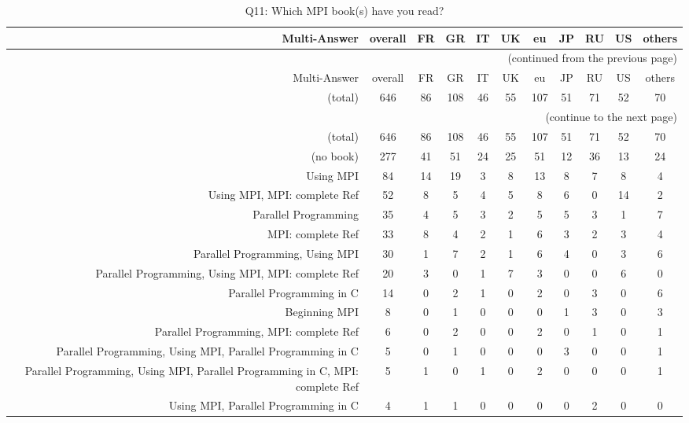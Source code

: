\clearpage%
{\footnotesize\begin{landscape}%
\begin{longtable}[htb]{r|c|c|c|c|c|c|c|c|c|c}%
\caption{Q11: Which MPI book(s) have you read?}%
\label{tab:Q11-mans} \\%
\hline%
Multi-Answer & overall & FR & GR & IT & UK & eu & JP & RU & US & others \\
 \hline%
\endfirsthead%
\multicolumn{11}{r}{(continued from the previous page)}\\%
\hline%
Multi-Answer & overall & FR & GR & IT & UK & eu & JP & RU & US & others \\
 \hline%
\endhead%
\hline%
(total) & 646 & 86 & 108 & 46 & 55 & 107 & 51 & 71 & 52 & 70 \\%
\hline%
\multicolumn{11}{r}{(continue to the next page)}\\%
\endfoot%
\hline%
(total) & 646 & 86 & 108 & 46 & 55 & 107 & 51 & 71 & 52 & 70 \\%
\hline%
\endlastfoot%
\hline%
{(no book)} & 277 & 41 & 51 & 24 & 25 & 51 & 12 & 36 & 13 & 24 \\%
{Using MPI} & 84 & 14 & 19 & 3 & 8 & 13 & 8 & 7 & 8 & 4 \\%
{Using MPI, MPI: complete Ref} & 52 & 8 & 5 & 4 & 5 & 8 & 6 & 0 & 14 & 2 \\%
{Parallel Programming} & 35 & 4 & 5 & 3 & 2 & 5 & 5 & 3 & 1 & 7 \\%
{MPI: complete Ref} & 33 & 8 & 4 & 2 & 1 & 6 & 3 & 2 & 3 & 4 \\%
{Parallel Programming, Using MPI} & 30 & 1 & 7 & 2 & 1 & 6 & 4 & 0 & 3 & 6 \\%
{Parallel Programming, Using MPI, MPI: complete Ref} & 20 & 3 & 0 & 1 & 7 & 3 & 0 & 0 & 6 & 0 \\%
{Parallel Programming in C} & 14 & 0 & 2 & 1 & 0 & 2 & 0 & 3 & 0 & 6 \\%
{Beginning MPI} & 8 & 0 & 1 & 0 & 0 & 0 & 1 & 3 & 0 & 3 \\%
{Parallel Programming, MPI: complete Ref} & 6 & 0 & 2 & 0 & 0 & 2 & 0 & 1 & 0 & 1 \\%
{Parallel Programming, Using MPI, Parallel Programming in C} & 5 & 0 & 1 & 0 & 0 & 0 & 3 & 0 & 0 & 1 \\%
{Parallel Programming, Using MPI, Parallel Programming in C, MPI: complete Ref} & 5 & 1 & 0 & 1 & 0 & 2 & 0 & 0 & 0 & 1 \\%
{Using MPI, Parallel Programming in C} & 4 & 1 & 1 & 0 & 0 & 0 & 0 & 2 & 0 & 0 \\%

\end{longtable}
\end{landscape}}
